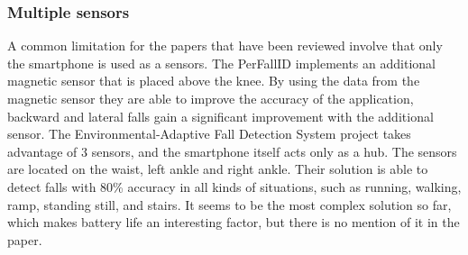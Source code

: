 \subsubsection{Multiple sensors}
A common limitation for the papers that have been reviewed involve that only the smartphone is used as a sensors. The PerFallID implements an additional magnetic  sensor that is placed above the knee. By using the data from the magnetic sensor they are able to improve the accuracy of the application, backward and lateral falls gain a significant improvement with the additional sensor. The Environmental-Adaptive Fall Detection System \cite{fallDetectionWithExtraSensors} project takes advantage of 3 sensors, and the smartphone itself acts only as a hub. The sensors are located on the waist, left ankle and right ankle. Their solution is able to detect falls with 80\% accuracy in all kinds of situations, such as running, walking, ramp, standing still, and stairs. It seems to be the most complex solution so far, which makes battery life an interesting factor, but there is no mention of it in the paper.
